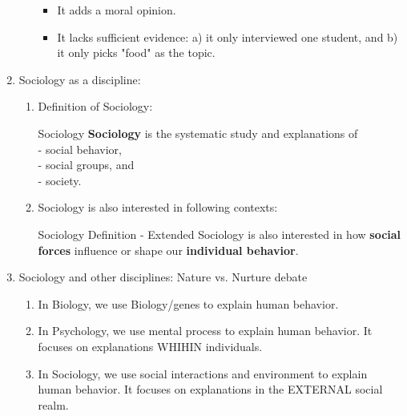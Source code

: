 \documentclass[12pt,a4paper]{article}
\begin{document}
\begin{enumerate}
\begin{enumerate}
		\begin{itemize}
			\item It adds a moral opinion.
			\item It lacks sufficient evidence: a) it only interviewed one student, and b) it only picks "food" as the topic.
		\end{itemize}
	\end{enumerate}
	\item Sociology as a discipline:
	\begin{enumerate}
		\item Definition of Sociology:
		\begin{df}{Sociology}
			\textbf{Sociology} is the systematic study and explanations of \\
			 - {social behavior}, \\
			 - {social groups}, and \\
			 - {society}.
		\end{df}
		\item Sociology is also interested in following contexts: 
		\begin{ext}{Sociology Definition - Extended}
			Sociology is also interested in how \textbf{social forces} influence or shape our \textbf{individual behavior}. 
		\end{ext}
	\end{enumerate}
	\item Sociology and other disciplines: Nature vs. Nurture debate
	\begin{enumerate}
		\item In Biology, we use Biology/genes to explain human behavior. 
		\item In Psychology, we use mental process to explain human behavior. It focuses on explanations WHIHIN individuals. 
		\item In Sociology, we use social interactions and environment to explain human behavior. It focuses on explanations in the EXTERNAL social realm. 
	\end{enumerate}
\end{enumerate}
\end{document}
